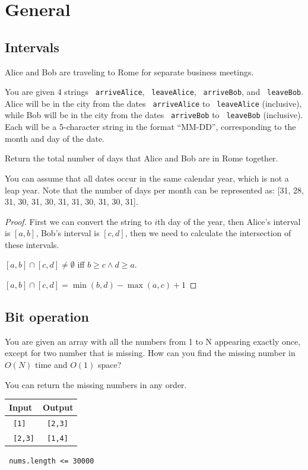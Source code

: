 \documentclass[11pt]{article}
\let\OldTexttt\texttt
\renewcommand{\texttt}[1]{\OldTexttt{\color{MidnightBlue} #1}}
\begin{document}
\section{General}
\label{sec:org6106e7a}
\subsection{Intervals}
\label{sec:orge624c25}
\begin{problem}
Alice and Bob are traveling to Rome for separate business meetings.

You are given 4 strings \texttt{arriveAlice}, \texttt{leaveAlice}, \texttt{arriveBob}, and \texttt{leaveBob}. Alice will be in the
city from the dates \texttt{arriveAlice} to \texttt{leaveAlice} (inclusive), while Bob will be in the city from
the dates \texttt{arriveBob} to \texttt{leaveBob} (inclusive). Each will be a 5-character string in the format
``MM-DD'', corresponding to the month and day of the date.

Return the total number of days that Alice and Bob are in Rome together.

You can assume that all dates occur in the same calendar year, which is not a leap year. Note
that the number of days  per month can be represented as: [31, 28, 31, 30, 31, 30, 31, 31, 30, 31, 30, 31].
\end{problem}

\begin{proof}
First we can convert the string to \(i\)th day of the year, then Alice's interval is \([a,b]\),
Bob's interval is \([c,d]\), then we need to calculate the intersection of these intervals.

\([a,b]\cap[c,d]\neq\emptyset\) iff \(b\ge c\wedge d\ge a\).

\([a,b]\cap[c,d]=\min(b,d)-\max(a,c)+1\)
\end{proof}

\subsection{Bit operation}
\label{sec:org3cf19cd}
\begin{problem}
You are given an array with all the numbers from 1 to N appearing exactly once, except for two
number that is missing. How can you find the missing number in \(O(N)\) time and \(O(1)\) space?

You can return the missing numbers in any order.

\begin{center}
\begin{tabular}{ll}
Input & Output\\
\hline
\texttt{[1]} & \texttt{[2,3]}\\
\texttt{[2,3]} & \texttt{[1,4]}\\
\end{tabular}
\end{center}


\texttt{nums.length <= 30000}
\end{problem}
\end{document}
